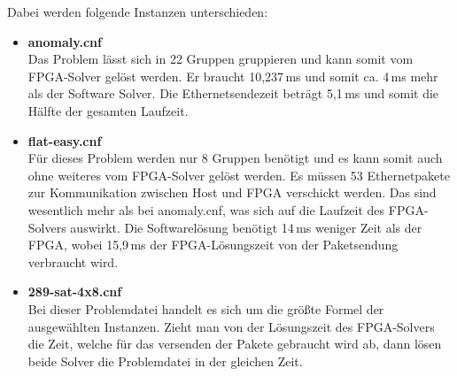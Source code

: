 \newpage
Dabei werden folgende Instanzen unterschieden:
\begin{itemize}
  \item
    \textbf{anomaly.cnf}\\
    Das Problem lässt sich in 22 Gruppen gruppieren und kann somit vom FPGA-Solver
    gelöst werden. Er braucht 10,237\,ms und somit ca. 4\,ms mehr als der Software
    Solver. Die Ethernetsendezeit beträgt 5,1\,ms und somit die Hälfte der gesamten
    Laufzeit.

  \item
    \textbf{flat-easy.cnf}\\
    Für dieses Problem werden nur 8 Gruppen benötigt und es kann somit auch ohne weiteres
    vom FPGA-Solver gelöst werden. Es müssen 53 Ethernetpakete zur Kommunikation
    zwischen Host und FPGA verschickt werden. Das sind wesentlich mehr als bei
    anomaly.cnf, was sich auf die Laufzeit des FPGA-Solvers auswirkt. Die Softwarelösung
    benötigt 14\,ms weniger Zeit als der FPGA, wobei 15,9\,ms der FPGA-Lösungszeit
    von der Paketsendung verbraucht wird.
\item
    \textbf{289-sat-4x8.cnf}\\
    Bei dieser Problemdatei handelt es sich um die größte Formel der
    ausgewählten Instanzen. Zieht
    man von der Lösungszeit des FPGA-Solvers die Zeit, welche
    für das versenden der Pakete gebraucht wird ab, dann lösen
    beide Solver die Problemdatei in der gleichen Zeit.

\end{itemize}
